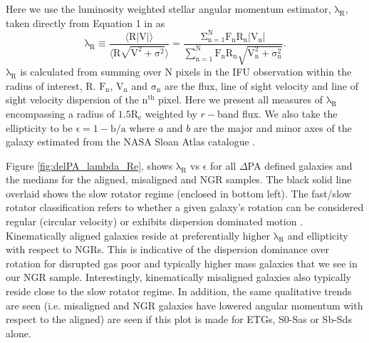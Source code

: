 Here we use the luminosity weighted stellar angular momentum estimator, $\mathrm{\lambda_R}$, taken directly from Equation 1 in \citet{emsellem2007} as
\begin{equation}
\mathrm{\lambda_{R} \equiv \frac{\langle R | V | \rangle}{ \langle R \sqrt{ V^{2} + \sigma^{2} } \rangle } = \frac{ \Sigma_{ n = 1 }^{ N } F_{ n } R_ { n } \left| V_{ n } \right| }{ \sum_{ n = 1 }^{ N } F_{n} R_{ n } \sqrt{ V_{ n }^{ 2 } + \sigma_{ n }^{ 2 } } }.}
\end{equation}
$\mathrm{\lambda_R}$ is calculated from summing over N pixels in the IFU observation within the radius of interest, $\mathrm{R}$. $\mathrm{F_{n}}$, $\mathrm{V_{n}}$ and $\mathrm{\sigma_{n}}$ are the flux, line of sight velocity and line of sight velocity dispersion of the $\mathrm{n^{th}}$ pixel. Here we present all measures of $\mathrm{\lambda_R}$ encompassing a radius of $\mathrm{1.5R_e}$ weighted by $r-$band flux. We also take the ellipticity to be $\mathrm{\epsilon = 1 - b/a}$ where $a$ and $b$ are the major and minor axes of the galaxy estimated from the NASA Sloan Atlas catalogue \cite[used for target selection in MaNGA;][]{blanton2011}.

Figure \ref{fig:delPA_lambda_Re}, shows $\mathrm{\lambda_R}$ vs $\mathrm{\epsilon}$ for all $\Delta$PA defined galaxies and the medians for the aligned, misaligned and NGR samples. The black solid line overlaid shows the slow rotator regime (enclosed in bottom left). The fast/slow rotator classification refers to whether a given galaxy's rotation can be considered regular (circular velocity) or exhibits dispersion dominated motion \citep[][]{emsellem2007}. Kinematically aligned galaxies reside at preferentially higher $\mathrm{\lambda_R}$ and ellipticity with respect to NGRs. This is indicative of the dispersion dominance over rotation for disrupted gas poor and typically higher mass galaxies that we see in our NGR sample. Interestingly, kinematically misaligned galaxies also typically reside close to the slow rotator regime. In addition, the same qualitative trends are seen (i.e. misaligned and NGR galaxies have lowered angular momentum with respect to the aligned) are seen if this plot is made for ETGs, S0-Sas or Sb-Sds alone. 

